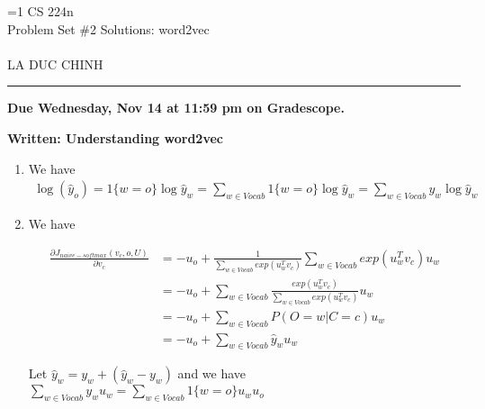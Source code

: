 \documentclass{article}
\def\solutions{1}
\newcommand{\ruleskip}{\bigskip\hrule\bigskip}
\begin{document}
\pagestyle{myheadings} 

\ifnum\solutions=1 {
	{\huge\noindent CS 224n\\
		Problem Set \#2 Solutions: word2vec}\\\\
	LA DUC CHINH
}  \fi

\ruleskip

{\bf Due Wednesday, Nov 14 at 11:59 pm on Gradescope.}

\medskip


\textbf{Written: Understanding word2vec}

\begin{enumerate}[label=(\alph*)]
	\item We have
	\begin{align}
		\log(\hat{y}_{o}) = 1\{w=o\} \log \hat{y}_{w} = \sum_{w\in Vocab} 1\{w=o\}\log \hat{y}_{w} = \sum_{w\in Vocab} y_{w}\log \hat{y}_{w}
	\end{align}
	
	\item We have
	
	\begin{align}
	\frac{\partial J_{naive-softmax}(v_{c},o,U)}{\partial{v_{c}}} &=-u_{o}+ \frac{1}{\sum_{w \in Vocab} exp(u_{w}^{T}v_{c})} \sum_{w\in Vocab}exp(u_{w}^{T}v_{c})u_{w} \\
	&=-u_{o}+ \sum_{w\in Vocab}\frac{exp(u_{w}^{T}v_{c})}{\sum_{w \in Vocab} exp(u_{w}^{T}v_{c})}u_{w} \\
	&=-u_{o}+\sum_{w\in Vocab}P(O=w|C=c)u_{w} \\
	&=-u_{o}+\sum_{w\in Vocab}\hat{y}_{w}u_{w} 
	\end{align}
	
	Let $\hat{y}_{w}=y_{w}+(\hat{y}_{w}-y_{w})$ and we have $\sum_{w\in Vocab}y_{w}u_{w}= \sum_{w\in Vocab}1\{w=o\}u_{w}u_{o} $
	

\end{enumerate}
\end{document}
